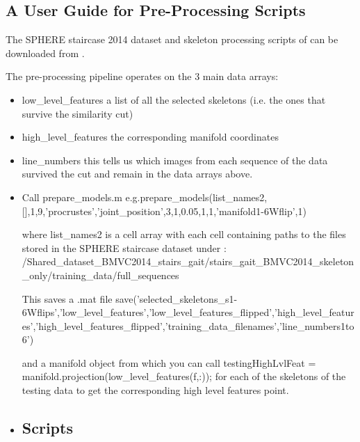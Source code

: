 \documentclass[11pt]{article} %
\begin{document}
\begin{appendices}
\section{A User Guide for Pre-Processing Scripts}
The SPHERE staircase 2014 dataset and skeleton processing scripts of \cite{Paiement} can be downloaded from \cite{SPHEREweb}.

The pre-processing pipeline operates on the 3 main data arrays:
\begin{itemize}
\item{
low_level_features
	  a list of all the selected skeletons (i.e. the ones that survive the similarity cut) }
\item{

high_level_features
	 the corresponding manifold coordinates}
\item{

line_numbers 
	this tells us which images from each sequence of the data survived the cut and remain in the data arrays above.}
\end{itemize}
	

\begin{itemize}
\item{Call prepare_models.m e.g.prepare_models(list_names2,[],1,9,'procrustes','joint_position',3,1,0.05,1,1,'manifold1-6Wflip',1) 
 	
	where list_names2 is a cell array with each cell containing paths to the files stored in the SPHERE staircase dataset under : 
	/Shared_dataset_BMVC2014_stairs_gait/stairs_gait_BMVC2014_skeleton_only/training_data/full_sequences
	
	This saves a .mat file  
	save('selected_skeletons_s1-6Wflips','low_level_features','low_level_features_flipped','high_level_features','high_level_features_flipped','training_data_filenames','line_numbers1to6')
	
	and a manifold object from which you can call testingHighLvlFeat = manifold.projection(low_level_features(f,:)); for each of the skeletons of the testing data to get the corresponding high level features point. 

	

	
	
	}
	
\item{
}


\subsection{Scripts}


\end{itemize}
\end{appendices}
\end{document}
